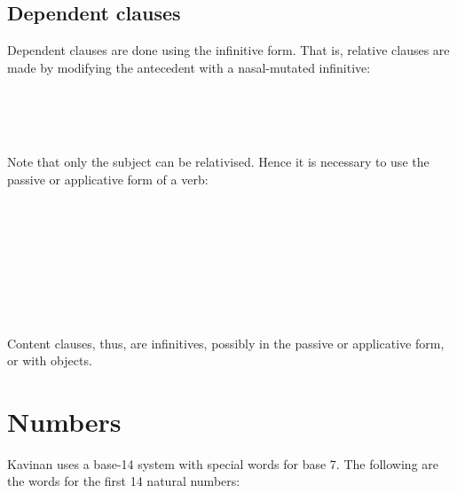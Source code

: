 \documentclass{book}
\begin{document}
\section{Dependent clauses}

Dependent clauses are done using the infinitive form. That is, relative clauses are made by modifying the antecedent with a nasal-mutated infinitive:

~ \\
    \\
    \\
   

Note that only the subject can be relativised. Hence it is necessary to use the passive or applicative form of a verb:

~ \\
      \\
      \\
    \\
~ \\
       \\
       \\
    

Content clauses, thus, are infinitives, possibly in the passive or applicative form, or with objects.

\chapter{Numbers}

Kavinan uses a base-14 system with special words for base 7. The following are the words for the first 14 natural numbers:
\end{document}

